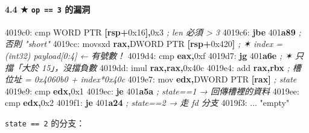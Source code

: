 \documentclass[10pt,a4paper]{article}
\newenvironment{Shaded}{\begin{snugshade}}{\end{snugshade}}
\newcommand{\BaseNTok}[1]{\textcolor[rgb]{0.00,0.00,0.81}{#1}}
\newcommand{\BuiltInTok}[1]{#1}
\newcommand{\CommentTok}[1]{\textcolor[rgb]{0.56,0.35,0.01}{\textit{#1}}}
\newcommand{\ControlFlowTok}[1]{\textcolor[rgb]{0.13,0.29,0.53}{\textbf{#1}}}
\newcommand{\DataTypeTok}[1]{\textcolor[rgb]{0.13,0.29,0.53}{#1}}
\newcommand{\DecValTok}[1]{\textcolor[rgb]{0.00,0.00,0.81}{#1}}
\newcommand{\ErrorTok}[1]{\textcolor[rgb]{0.64,0.00,0.00}{\textbf{#1}}}
\newcommand{\KeywordTok}[1]{\textcolor[rgb]{0.13,0.29,0.53}{\textbf{#1}}}
\newcommand{\NormalTok}[1]{#1}
\newcommand{\OperatorTok}[1]{\textcolor[rgb]{0.81,0.36,0.00}{\textbf{#1}}}
\newcommand{\StringTok}[1]{\textcolor[rgb]{0.31,0.60,0.02}{#1}}
\renewenvironment{Shaded}{%
  \def\FrameCommand{\fboxsep=3.2pt\colorbox{shadecolor}}%
  \MakeFramed{\advance\hsize-\width\FrameRestore\small}%
}{%
  \endMakeFramed
}
\begin{document}
\paragraph{\texorpdfstring{4.4 ★ \texttt{op\ \allowbreak{}==\ \allowbreak{}3}
的漏洞}{4.4 ★ op == 3 的漏洞}}\label{op-3-ux7684ux6f0fux6d1e}

\begin{Shaded}
\begin{Highlighting}[]
\NormalTok{4019c0:  }\BuiltInTok{cmp}  \DataTypeTok{WORD} \DataTypeTok{PTR} \OperatorTok{[}\KeywordTok{rsp}\OperatorTok{+}\BaseNTok{0x16}\OperatorTok{],}\BaseNTok{0x3}    \CommentTok{; len 必須 \textgreater{} 3}
\NormalTok{4019c6:  }\ControlFlowTok{jbe}   \DecValTok{401}\ErrorTok{a89}                    \CommentTok{; 否則 "short"}
\NormalTok{4019cc:  }\BuiltInTok{movsxd} \KeywordTok{rax}\OperatorTok{,}\DataTypeTok{DWORD} \DataTypeTok{PTR} \OperatorTok{[}\KeywordTok{rsp}\OperatorTok{+}\BaseNTok{0x420}\OperatorTok{]} \CommentTok{; ✶ index = (int32) payload[0:4]  ← 有號數！}
\NormalTok{4019d4:  }\BuiltInTok{cmp}  \KeywordTok{eax}\OperatorTok{,}\BaseNTok{0xf}
\NormalTok{4019d7:  }\ControlFlowTok{jg}   \DecValTok{401}\ErrorTok{a6e}                     \CommentTok{; ✶ 只擋「大於 15」，沒擋負數}
\NormalTok{4019dd:  }\BuiltInTok{imul} \KeywordTok{rax}\OperatorTok{,}\KeywordTok{rax}\OperatorTok{,}\BaseNTok{0x40c}
\NormalTok{4019e4:  }\BuiltInTok{add}  \KeywordTok{rax}\OperatorTok{,}\KeywordTok{rbx}                    \CommentTok{; 槽位址 = 0x4060b0 + index*0x40c}
\NormalTok{4019e7:  }\BuiltInTok{mov}  \KeywordTok{edx}\OperatorTok{,}\DataTypeTok{DWORD} \DataTypeTok{PTR} \OperatorTok{[}\KeywordTok{rax}\OperatorTok{]}        \CommentTok{; state}
\NormalTok{4019e9:  }\BuiltInTok{cmp}  \KeywordTok{edx}\OperatorTok{,}\BaseNTok{0x1}
\NormalTok{4019ec:  }\ControlFlowTok{je}   \DecValTok{401}\ErrorTok{a5a}                     \CommentTok{; state==1 → 回傳槽裡的資料}
\NormalTok{4019ee:  }\BuiltInTok{cmp}  \KeywordTok{edx}\OperatorTok{,}\BaseNTok{0x2}
\NormalTok{4019f1:  }\ControlFlowTok{je}   \DecValTok{401}\ErrorTok{a24}                     \CommentTok{; state==2 → 走 fd 分支}
\NormalTok{4019f3:  ... "empty}\StringTok{"}
\end{Highlighting}
\end{Shaded}

\texttt{state\ \allowbreak{}==\ \allowbreak{}2} 的分支：
\end{document}
